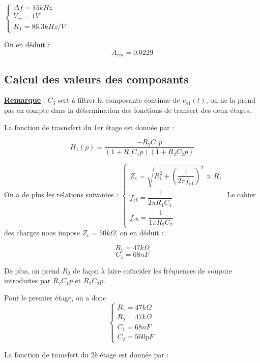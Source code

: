 \documentclass[a4paper]{report}
\begin{document}
$\left\{
\begin{array}{l}
  \Delta f = 15kHz\\
  V_{cc} = 1V\\
  K_1 = 86.3kHz/V
\end{array}
\right.$

On en déduit : 
$$A_{vm} = 0.0229$$

\subsection{Calcul des valeurs des composants}

\textbf{\underline{Remarque}} :
\newline
\newline
$C_3$ sert à filtrer la composante continue de $v_{s1}(t)$, on ne la prend pas en compte dans la détermination des fonctions de transert des deux étages. 
\newline
\newline

La fonction de trasnsfert du 1er étage est donnée par :

$$H_1(p) = \dfrac{-R_2C_1p}{(1+R_1C_1p)(1+R_2C_2p)}$$

On a de plus les relations suivantes :
\newline
\newline
$\left\{
\begin{array}{l}
  Z_e = \sqrt{R_1^2 + (\dfrac{1}{2\pi f_{c1}})^2} \approx R_1 \\
  f_{cb} = \dfrac{1}{2\pi R_1C_1}\\
  f_{ch} = \dfrac{1}{1\pi R_2C_2}
\end{array}
\right.$
\newline
\newline
Le cahier des charges nous impose $Z_e = 50k\Omega$, on en déduit :

$$R_1 = 47k\Omega$$
$$C_1 = 68nF$$

De plus, on prend $R_2$ de façon à faire coïncider les fréquences de coupure introduites par $R_2C_1p$ et $R_2C_2p$.

Pour le premier étage, on a donc \\
$$\left\{
\begin{array}{l}
  R_1 = 47k\Omega\\
  R_2 = 47k\Omega\\
  C_1 = 68nF\\
  C_2 = 560pF
\end{array}
\right.$$

La fonction de transfert du 2è étage est donnée par :
\end{document}

